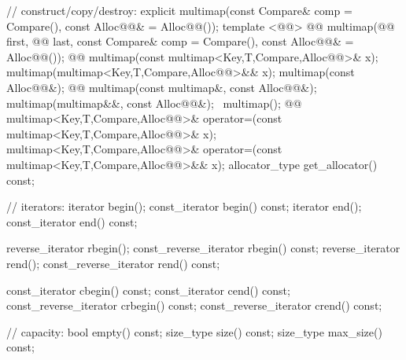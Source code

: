 \documentclass[american,twoside]{book}
\begin{document}
\begin{codeblock}
{{    // construct/copy/destroy:
    explicit multimap(const Compare& comp = Compare(),
                      const Alloc@@& = Alloc@@());
    template <@@>
      @@
      multimap(@@ first, @@ last,
          const Compare& comp = Compare(), const Alloc@@& = Alloc@@());
    @@ 
      multimap(const multimap<Key,T,Compare,Alloc@@>& x);
    multimap(multimap<Key,T,Compare,Alloc@@>&& x);
    multimap(const Alloc@@&);
    @@ 
      multimap(const multimap&, const Alloc@@&);
    multimap(multimap&&, const Alloc@@&);
   ~multimap();
    @@
      multimap<Key,T,Compare,Alloc@@>& operator=(const multimap<Key,T,Compare,Alloc@@>& x);
    multimap<Key,T,Compare,Alloc@@>&
      operator=(const multimap<Key,T,Compare,Alloc@@>&& x);
    allocator_type get_allocator() const;

    // iterators:
    iterator               begin();
    const_iterator         begin() const;
    iterator               end();
    const_iterator         end() const;

    reverse_iterator       rbegin();
    const_reverse_iterator rbegin() const;
    reverse_iterator       rend();
    const_reverse_iterator rend() const;

    const_iterator         cbegin() const;
    const_iterator         cend() const;
    const_reverse_iterator crbegin() const;
    const_reverse_iterator crend() const;

    // capacity:
    bool           empty() const;
    size_type      size() const;
    size_type      max_size() const;

}}
\end{codeblock}
\end{document}

